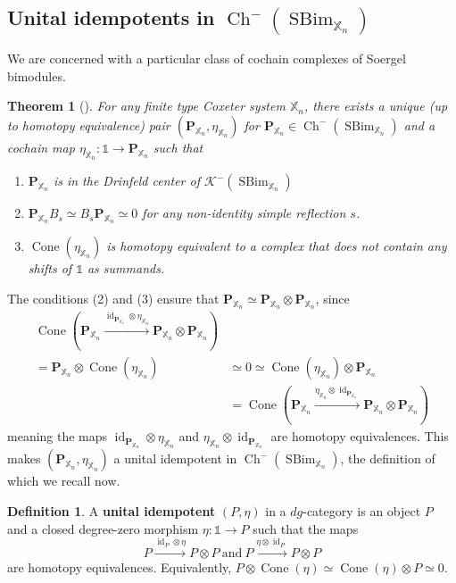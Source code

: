 \documentclass[11pt]{article}
\DeclareMathOperator{\Cone}{Cone}
\DeclareMathOperator{\id}{id}
\DeclareMathOperator{\Ch}{Ch}
\DeclareMathOperator{\SBim}{SBim}
\newtheorem{thm}{Theorem}[section]
\theoremstyle{definition}
\newtheorem{definition}{Definition}[section]
\theoremstyle{remark}
\numberwithin{equation}{section}
\begin{document}
\subsection{Unital idempotents in $\Ch^-(\SBim_{\mathbb{X}_n})$}
We are concerned with a particular class of cochain complexes of
Soergel bimodules.
\begin{thm}[\cite{hogancamp_constructing_2020}]
	\label{thm:sbimidempotent}
	For any finite type Coxeter system $\mathbb{X}_n$, there exists a unique
	(up to homotopy equivalence)
	pair $(\mathbf{P}_{\mathbb{X}_n},\eta_{\mathbb{X}_n})$ for
	$\mathbf{P}_{\mathbb{X}_n} \in \Ch^-(\SBim_{\mathbb{X}_n})$ and
	a cochain map
	$\eta_{\mathbb{X}_n}:\mathbb{1}\to \mathbf{P}_{\mathbb{X}_n}$ such that
	\begin{enumerate}[label=(\arabic*)]
		\item $\mathbf{P}_{\mathbb{X}_n}$ is in the Drinfeld center of
			$\mathcal{K}^-(\SBim_{\mathbb{X}_n})$
		\item $\mathbf{P}_{\mathbb{X}_n}B_{s}\simeq B_{s}
			\mathbf{P}_{\mathbb{X}_n}\simeq 0$ for any non-identity
			simple reflection $s$.
		\item $\Cone(\eta_{\mathbb{X}_n})$ is homotopy equivalent to
			a complex that does not contain any shifts of
			$\mathbb{1}$ as summands.
	\end{enumerate}	
\end{thm}
\noindent The conditions (2) and (3) ensure that $\mathbf{P}_{\mathbb{X}_n}
\simeq \mathbf{P}_{\mathbb{X}_n}\otimes \mathbf{P}_{\mathbb{X}_n}$, since
\begin{align*}\Cone(\mathbf{P}_{\mathbb{X}_n}
	\xrightarrow{\id_{\mathbf{P}_{\mathbb{X}_n}}
	\otimes \eta_{\mathbb{X}_n}}
	\mathbf{P}_{\mathbb{X}_n}\otimes \mathbf{P}_{\mathbb{X}_n})&\\=
	\mathbf{P}_{\mathbb{X}_n}\otimes \Cone(\eta_{\mathbb{X}_n}) &\simeq 0 \simeq
	\Cone(\eta_{\mathbb{X}_n})\otimes \mathbf{P}_{\mathbb{X}_n}\\ &=
	\Cone(\mathbf{P}_{\mathbb{X}_n}\xrightarrow{\eta_{\mathbb{X}_n}\otimes
\id_{\mathbf{P}_{\mathbb{X}_n}}}\mathbf{P}_{\mathbb{X}_n}
\otimes \mathbf{P}_{\mathbb{X}_n})\end{align*}
meaning the maps $\id_{\mathbf{P}_{\mathbb{X}_n}} \otimes
\eta_{\mathbb{X}_n}$ and $\eta_{\mathbb{X}_n}\otimes \id_{\mathbf{P}_{\mathbb{X}_n}}$ are homotopy equivalences.
This makes $(\mathbf{P}_{\mathbb{X}_n}, \eta_{\mathbb{X}_n})$ a unital idempotent in
$\Ch^-(\SBim_{\mathbb{X}_n})$, the definition of which we recall now.
\begin{definition}
	A \textbf{unital idempotent} $(P,\eta)$ in a $dg$-category is an object $P$
and a closed degree-zero morphism $\eta:\mathbb{1}\to P$ such that the maps
\[P\xrightarrow{\id_P\otimes \eta} P\otimes P\ \mathrm{and}\ 
P\xrightarrow{\eta\otimes \id_P} P\otimes P\] are
homotopy equivalences.
Equivalently, $P\otimes \Cone(\eta)\simeq \Cone(\eta)\otimes P\simeq  0$.
\end{definition}
\end{document}
